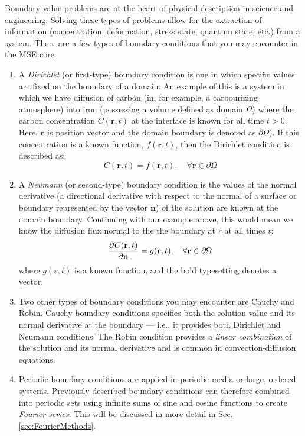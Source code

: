 Boundary value problems are at the heart of physical description in science and engineering. Solving these types of problems allow for the extraction of information (concentration, deformation, stress state, quantum state, etc.) from a system. There are a few types of boundary conditions that you may encounter in the MSE core: %
\begin{enumerate}
	\item A \textit{Dirichlet} (or first-type) boundary condition is one in which specific values are fixed on the boundary of a domain. An example of this is a system in which we have diffusion of carbon (in, for example, a carbourizing atmosphere) into iron (possessing a volume defined as domain $\Omega$) where the carbon concentration $C(\mathbf{r},t)$ at the interface is known for all time $t > 0$. Here, $\mathbf{r}$ is position vector and the domain boundary is denoted as $\partial \Omega$). If this concentration is a known function, $f(\textbf{r},t)$, then the Dirichlet condition is described as:
%	
\[C(\textbf{r},t) = f(\textbf{r},t), \quad	\forall\textbf{r} \in \partial \Omega\] %
%	
	\item A \textit{Neumann} (or second-type) boundary condition is the values of the normal derivative (a directional derivative with respect to the normal of a surface or boundary represented by the vector $\mathbf{n}$) of the solution are known at the domain boundary. Continuing with our example above, this would mean we know the diffusion flux normal to the the boundary at $r$ at all times $t$:
%	
	\[\mathop{}\!\frac{\partial^{}{C(\textbf{r},t)}}{\partial{\mathbf{n}}^{}} = g(\textbf{r},t), \quad	\forall\textbf{r} \in \partial \Omega\] %
%
where $g(\textbf{r},t)$ is a known function, and the bold typesetting denotes a vector.
	\item Two other types of boundary conditions you may encounter are Cauchy and Robin. Cauchy boundary conditions specifies both the solution value and its normal derivative at the boundary --- i.e., it provides both Dirichlet and Neumann conditions. The Robin condition provides a \textit{linear combination} of the solution and its normal derivative and is common in convection-diffusion equations.  
	\item Periodic boundary conditions are applied in periodic media or large, ordered systems. Previously described boundary conditions can therefore combined into periodic sets using infinite sums of sine and cosine functions to create \textit{Fourier series}. This will be discussed in more detail in Sec. \ref{sec:FourierMethods}. 
\end{enumerate}


